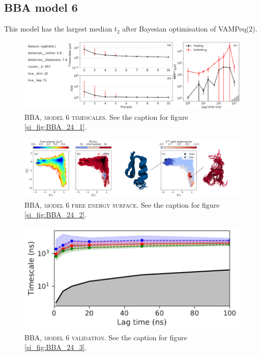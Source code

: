 \documentclass{article}
\begin{document}
\FloatBarrier
\clearpage


\subsection{BBA model 6}

This model has the largest median $t_{2}$ after Bayesian optimisation of VAMPeq(2).

\begin{figure}[h]
    \centering
    \includegraphics[width=\columnwidth]{SI_figures/BBA_185_SI-1.pdf}
    \caption{\textsc{BBA,  model 6 timescales}. See the caption for figure \ref{si_fig:BBA_24_1}.}
    \label{si_fig:BBA_185_1}
\end{figure}

\begin{figure}[h]
    \centering
    \includegraphics[width=\columnwidth]{SI_figures/BBA_185_SI-2.png}
    \caption{\textsc{BBA,  model 6 free energy surface}. See the caption for figure \ref{si_fig:BBA_24_2}.}
    \label{si_fig:BBA_185_2}
\end{figure}

\begin{figure}[h]
    \centering
    \includegraphics[height=0.15\textheight]{SI_figures/BBA_185_its.pdf}
    \caption{\textsc{BBA, model 6 validation}. See the caption for  figure \ref{si_fig:BBA_24_3}.}
    \label{si_fig:BBA_185_3}
\end{figure}
\end{document}
